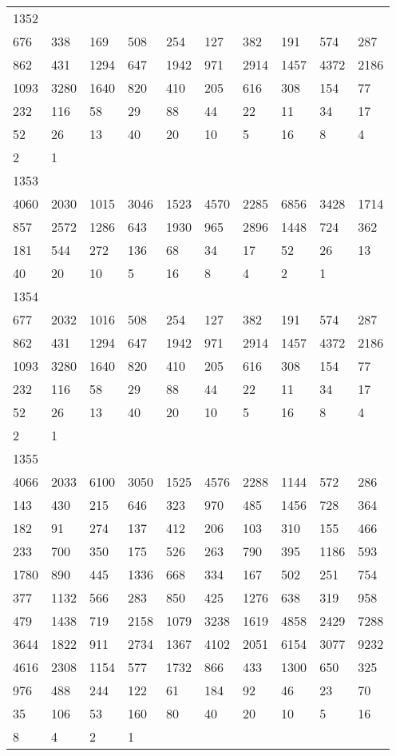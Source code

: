 \begin{longtable}{*{10}{l}}
1352&&&&&&&&&\\
676& 338& 169& 508& 254& 127& 382& 191& 574& 287\\
862& 431& 1294& 647& 1942& 971& 2914& 1457& 4372& 2186\\
1093& 3280& 1640& 820& 410& 205& 616& 308& 154& 77\\
232& 116& 58& 29& 88& 44& 22& 11& 34& 17\\
52& 26& 13& 40& 20& 10& 5& 16& 8& 4\\
2& 1& \\

1353&&&&&&&&&\\
4060& 2030& 1015& 3046& 1523& 4570& 2285& 6856& 3428& 1714\\
857& 2572& 1286& 643& 1930& 965& 2896& 1448& 724& 362\\
181& 544& 272& 136& 68& 34& 17& 52& 26& 13\\
40& 20& 10& 5& 16& 8& 4& 2& 1& \\

1354&&&&&&&&&\\
677& 2032& 1016& 508& 254& 127& 382& 191& 574& 287\\
862& 431& 1294& 647& 1942& 971& 2914& 1457& 4372& 2186\\
1093& 3280& 1640& 820& 410& 205& 616& 308& 154& 77\\
232& 116& 58& 29& 88& 44& 22& 11& 34& 17\\
52& 26& 13& 40& 20& 10& 5& 16& 8& 4\\
2& 1& \\

1355&&&&&&&&&\\
4066& 2033& 6100& 3050& 1525& 4576& 2288& 1144& 572& 286\\
143& 430& 215& 646& 323& 970& 485& 1456& 728& 364\\
182& 91& 274& 137& 412& 206& 103& 310& 155& 466\\
233& 700& 350& 175& 526& 263& 790& 395& 1186& 593\\
1780& 890& 445& 1336& 668& 334& 167& 502& 251& 754\\
377& 1132& 566& 283& 850& 425& 1276& 638& 319& 958\\
479& 1438& 719& 2158& 1079& 3238& 1619& 4858& 2429& 7288\\
3644& 1822& 911& 2734& 1367& 4102& 2051& 6154& 3077& 9232\\
4616& 2308& 1154& 577& 1732& 866& 433& 1300& 650& 325\\
976& 488& 244& 122& 61& 184& 92& 46& 23& 70\\
35& 106& 53& 160& 80& 40& 20& 10& 5& 16\\
8& 4& 2& 1& \\


\end{longtable}
